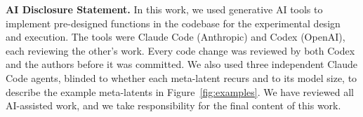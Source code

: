\textbf{AI Disclosure Statement.} In this work, we used generative AI tools to implement pre-designed functions in the codebase for the experimental design and execution. The tools were Claude Code (Anthropic) and Codex (OpenAI), each reviewing the other’s work. Every code change was reviewed by both Codex and the authors before it was committed. We also used three independent Claude Code agents, blinded to whether each meta-latent recurs and to its model size, to describe the example meta-latents in Figure~\ref{fig:examples}. We have reviewed all AI-assisted work, and we take responsibility for the final content of this work.
